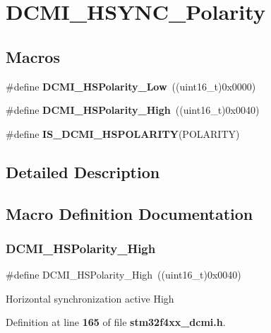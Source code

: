 \section{D\+C\+M\+I\+\_\+\+H\+S\+Y\+N\+C\+\_\+\+Polarity}
\label{group__DCMI__HSYNC__Polarity}
\subsection*{Macros}
\begin{DoxyCompactItemize}
\item 
\#define \textbf{ D\+C\+M\+I\+\_\+\+H\+S\+Polarity\+\_\+\+Low}~((uint16\+\_\+t)0x0000)
\item 
\#define \textbf{ D\+C\+M\+I\+\_\+\+H\+S\+Polarity\+\_\+\+High}~((uint16\+\_\+t)0x0040)
\item 
\#define \textbf{ I\+S\+\_\+\+D\+C\+M\+I\+\_\+\+H\+S\+P\+O\+L\+A\+R\+I\+TY}(P\+O\+L\+A\+R\+I\+TY)
\end{DoxyCompactItemize}


\subsection{Detailed Description}


\subsection{Macro Definition Documentation}
\mbox{\label{group__DCMI__HSYNC__Polarity_gab7d13846b01ffa41fdfc1987f0a91a67}} 
\subsubsection{D\+C\+M\+I\+\_\+\+H\+S\+Polarity\+\_\+\+High}
{\footnotesize\ttfamily \#define D\+C\+M\+I\+\_\+\+H\+S\+Polarity\+\_\+\+High~((uint16\+\_\+t)0x0040)}

Horizontal synchronization active High 

Definition at line \textbf{ 165} of file \textbf{ stm32f4xx\+\_\+dcmi.\+h}.

